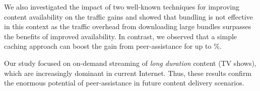 \documentclass[10pt, conference, letterpaper]{IEEEtran}
\begin{document}
We also investigated the impact of two well-known techniques for improving content availability on the traffic gains and showed that bundling is not effective in this context as the traffic overhead from downloading large bundles surpasses the benefits of improved availability. In contrast, we observed that a simple caching approach can boost the gain from peer-assistance for up to \%.

Our study focused on on-demand streaming of  \emph{long duration} content (TV shows), which are increasingly dominant in current Internet. Thus, these results confirm the enormous potential of peer-assistance in future content delivery scenarios.
 



\vspace{4mm}

\end{document}
